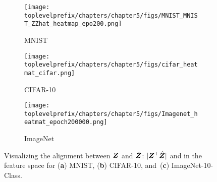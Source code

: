 \documentclass[../../book-main.tex]{subfiles}
\begin{document}
\begin{figure}[t]
    \begin{subfigure}[t]{0.3\textwidth}
        \centering
        \texttt{[image: \\toplevelprefix/chapters/chapter5/figs/MNIST\_MNIST\_ZZhat\_heatmap\_epo200.png]}
        \caption{MNIST}
    \end{subfigure}
    \hfill
    \begin{subfigure}[t]{0.3\textwidth}
        \centering
        \texttt{[image: \\toplevelprefix/chapters/chapter5/figs/cifar\_heatmat\_cifar.png]}
        \caption{CIFAR-10}
    \end{subfigure}
    \hfill
    \begin{subfigure}[t]{0.3\textwidth}
        \centering
        \texttt{[image: \\toplevelprefix/chapters/chapter5/figs/Imagenet\_heatmat\_epoch200000.png]}
        \caption{ImageNet}
    \end{subfigure}
    \caption{{Visualizing} %
    the alignment between $\bm{Z}$ and $\hat{\bm{Z}}$: $|\bm{Z}^\top \hat{\bm{Z}}|$ and  in the feature space for (\textbf{a}) MNIST, (\textbf{b}) CIFAR-10, and~(\textbf{c}) ImageNet-10-Class.}
    \label{fig:justifyz=z}
\end{figure}
 


\end{document}
